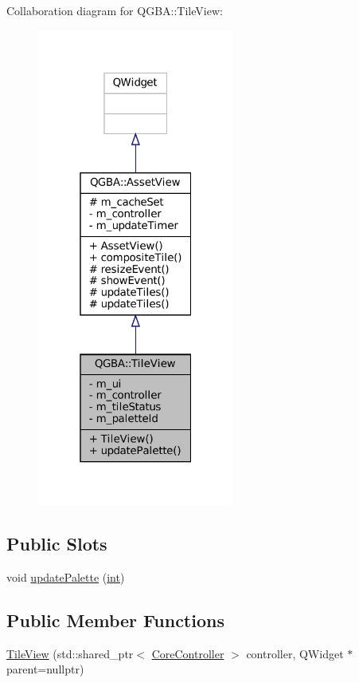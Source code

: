 Collaboration diagram for Q\+G\+BA\+:\+:Tile\+View\+:
\nopagebreak
\begin{figure}[H]
\begin{center}
\leavevmode
\includegraphics[width=184pt]{class_q_g_b_a_1_1_tile_view__coll__graph}
\end{center}
\end{figure}
\subsection*{Public Slots}
\begin{DoxyCompactItemize}
\item 
void \mbox{\hyperlink{class_q_g_b_a_1_1_tile_view_a32d30c057994015181a0be9d2de123ab}{update\+Palette}} (\mbox{\hyperlink{ioapi_8h_a787fa3cf048117ba7123753c1e74fcd6}{int}})
\end{DoxyCompactItemize}
\subsection*{Public Member Functions}
\begin{DoxyCompactItemize}
\item 
\mbox{\hyperlink{class_q_g_b_a_1_1_tile_view_af2a7f266052e05ca0a2378f63d6fb228}{Tile\+View}} (std\+::shared\+\_\+ptr$<$ \mbox{\hyperlink{class_q_g_b_a_1_1_core_controller}{Core\+Controller}} $>$ controller, Q\+Widget $\ast$parent=nullptr)
\end{DoxyCompactItemize}
